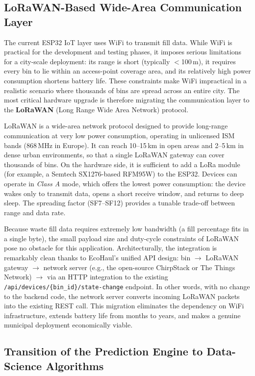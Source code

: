 \documentclass[12pt,a4paper]{report}
\begin{document}
\subsection{LoRaWAN-Based Wide-Area Communication Layer}

\indent The current ESP32 IoT layer uses WiFi to transmit fill data. While WiFi is practical for the development and testing phases, it imposes serious limitations for a city-scale deployment: its range is short (typically $<$100\,m), it requires every bin to lie within an access-point coverage area, and its relatively high power consumption shortens battery life. These constraints make WiFi impractical in a realistic scenario where thousands of bins are spread across an entire city. The most critical hardware upgrade is therefore migrating the communication layer to the \textbf{LoRaWAN} (Long Range Wide Area Network) protocol.

\indent LoRaWAN is a wide-area network protocol designed to provide long-range communication at very low power consumption, operating in unlicensed ISM bands (868\,MHz in Europe). It can reach 10--15\,km in open areas and 2--5\,km in dense urban environments, so that a single LoRaWAN gateway can cover thousands of bins. On the hardware side, it is sufficient to add a LoRa module (for example, a Semtech SX1276-based RFM95W) to the ESP32. Devices can operate in \textit{Class A} mode, which offers the lowest power consumption: the device wakes only to transmit data, opens a short receive window, and returns to deep sleep. The spreading factor (SF7--SF12) provides a tunable trade-off between range and data rate.

\indent Because waste fill data requires extremely low bandwidth (a fill percentage fits in a single byte), the small payload size and duty-cycle constraints of LoRaWAN pose no obstacle for this application. Architecturally, the integration is remarkably clean thanks to EcoHaul's unified API design: bin $\rightarrow$ LoRaWAN gateway $\rightarrow$ network server (e.g., the open-source ChirpStack or The Things Network) $\rightarrow$ via an HTTP integration to the existing \texttt{/api/devices/\{bin\_id\}/state-change} endpoint. In other words, with no change to the backend code, the network server converts incoming LoRaWAN packets into the existing REST call. This migration eliminates the dependency on WiFi infrastructure, extends battery life from months to years, and makes a genuine municipal deployment economically viable.

\subsection{Transition of the Prediction Engine to Data-Science Algorithms}
\end{document}
